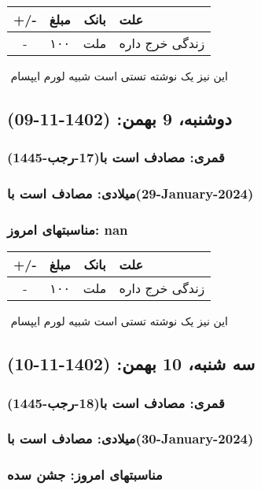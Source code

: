 \documentclass{article}
\newcommand{\rnote}[1]{\marginpar{\textcolor{color}{\StrSubstitute{\##1}{ }{\_}}}}
\newcommand{\myRow}[4]{
    #1 & #2 & #3 & #4 \\ \hline
}
\begin{document}
\begin{tabular}{ | c | c | c | p{5cm} |}
    \hline
    \myRow{ +/- }{مبلغ}{بانک}{علت}
    \myRow{-}{۱۰۰}{ملت}{زندگی خرج داره}
\end{tabular}
\newline
\newline

‌
\rnote{تست}
این نیز یک نوشته تستی است شبیه لورم ایپسام




\newpage
{}
\textcolor{color}{
\section{ دوشنبه، 9 بهمن: (1402-11-09) }
\subsubsection*{قمری: مصادف است با(17-رجب-1445)} 
\subsubsection*{میلادی: مصادف است با(29-January-2024)}
\subsubsection*{مناسبتهای امروز: nan}
}


\begin{tabular}{ | c | c | c | p{5cm} |}
    \hline
    \myRow{ +/- }{مبلغ}{بانک}{علت}
    \myRow{-}{۱۰۰}{ملت}{زندگی خرج داره}
\end{tabular}
\newline
\newline

‌
\rnote{تست}
این نیز یک نوشته تستی است شبیه لورم ایپسام




\newpage
{}
\textcolor{color}{
\section{ سه شنبه، 10 بهمن: (1402-11-10) }
\subsubsection*{قمری: مصادف است با(18-رجب-1445)} 
\subsubsection*{میلادی: مصادف است با(30-January-2024)}
\subsubsection*{مناسبتهای امروز: جشن سده}
}
\end{document}
